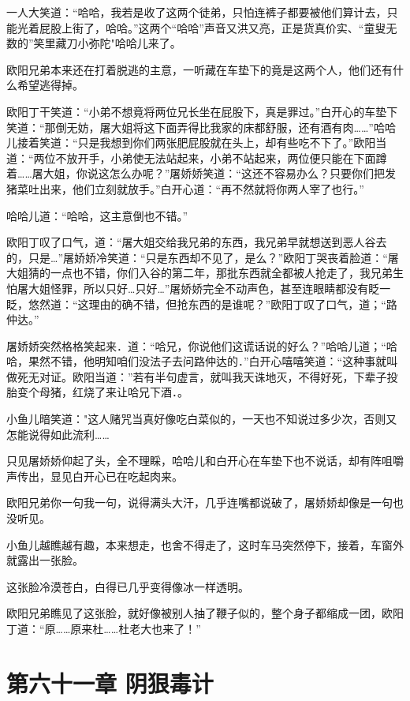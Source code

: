 \documentclass[12pt,oneside]{book}
\begin{document}
一人大笑道：``哈哈，我若是收了这两个徒弟，只怕连裤子都要被他们算计去，只能光着屁股上街了，哈哈。''这两个``哈哈''声音又洪又亮，正是货真价实、``童叟无数的''笑里藏刀小弥陀"哈哈儿来了。

欧阳兄弟本来还在打着脱逃的主意，一听藏在车垫下的竟是这两个人，他们还有什么希望逃得掉。

欧阳丁干笑道：``小弟不想竟将两位兄长坐在屁股下，真是罪过。''白开心的车垫下笑道：``那倒无妨，屠大姐将这下面弄得比我家的床都舒服，还有酒有肉\ldots\ldots{}''哈哈儿接着笑道：``只是我想到你们两张肥屁股就在头上，却有些吃不下了。''欧阳当道：``两位不放开手，小弟使无法站起来，小弟不站起来，两位便只能在下面蹲着\ldots\ldots 屠大姐，你说这怎么办呢？''屠娇娇笑道：``这还不容易办么？只要你们把发猪菜吐出来，他们立刻就放手。''白开心道：``再不然就将你两人宰了也行。''

哈哈儿道：``哈哈，这主意倒也不错。''

欧阳丁叹了口气，道：``屠大姐交给我兄弟的东西，我兄弟早就想送到恶人谷去的，只是\ldots{}''屠娇娇冷笑道：``只是东西却不见了，是么？''欧阳丁哭丧着脸道：``屠大姐猜的一点也不错，你们入谷的第二年，那批东西就全都被人抢走了，我兄弟生怕屠大姐怪罪，所以只好\ldots 只好\ldots{}''屠娇娇完全不动声色，甚至连眼睛都没有眨一眨，悠然道：``这理由的确不错，但抢东西的是谁呢？''欧阳丁叹了口气，道；``路仲达。''

屠娇娇突然格格笑起来．道：``哈兄，你说他们这谎话说的好么？''哈哈儿道；``哈哈，果然不错，他明知咱们没法子去问路仲达的．''白开心嘻嘻笑道：``这种事就叫做死无对证。欧阳当道：''若有半句虚言，就叫我天诛地灭，不得好死，下辈子投胎变个母猪，红烧了来让哈兄下酒．。

小鱼儿暗笑道："这人赌咒当真好像吃白菜似的，一天也不知说过多少次，否则又怎能说得如此流利\ldots\ldots{}

只见屠娇娇仰起了头，全不理睬，哈哈儿和白开心在车垫下也不说话，却有阵咀嚼声传出，显见白开心已在吃起肉来。

欧阳兄弟你一句我一句，说得满头大汗，几乎连嘴都说破了，屠娇娇却像是一句也没听见。

小鱼儿越瞧越有趣，本来想走，也舍不得走了，这时车马突然停下，接着，车窗外就露出一张脸。

这张脸冷漠苍白，白得已几乎变得像冰一样透明。

欧阳兄弟瞧见了这张脸，就好像被别人抽了鞭子似的，整个身子都缩成一团，欧阳丁道：``原\ldots\ldots 原来杜\ldots\ldots 杜老大也来了！''

\hypertarget{ux7b2cux516dux5341ux4e00ux7ae0-ux9634ux72e0ux6bd2ux8ba1}{%
\chapter{第六十一章
阴狠毒计}\label{ux7b2cux516dux5341ux4e00ux7ae0-ux9634ux72e0ux6bd2ux8ba1}}
\end{document}
